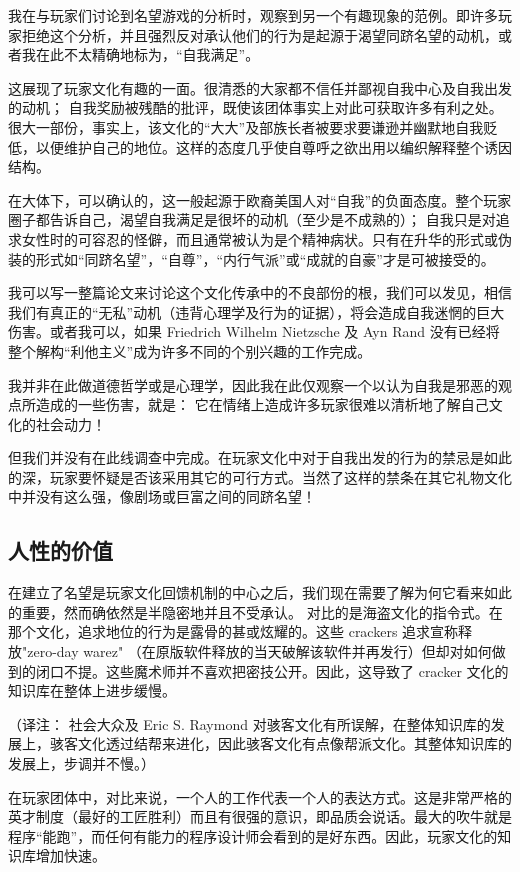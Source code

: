 我在与玩家们讨论到名望游戏的分析时，观察到另一个有趣现象的范例。即许多玩家拒绝这个分析，并且强烈反对承认他们的行为是起源于渴望同跻名望的动机，或者我在此不太精确地标为，“自我满足”。

这展现了玩家文化有趣的一面。很清悉的大家都不信任并鄙视自我中心及自我出发的动机； 自我奖励被残酷的批评，既使该团体事实上对此可获取许多有利之处。很大一部份，事实上，该文化的“大大”及部族长者被要求要谦逊并幽默地自我贬低，以便维护自己的地位。这样的态度几乎使自尊呼之欲出用以编织解释整个诱因结构。

在大体下，可以确认的，这一般起源于欧裔美国人对“自我”的负面态度。整个玩家圈子都告诉自己，渴望自我满足是很坏的动机（至少是不成熟的）； 自我只是对追求女性时的可容忍的怪僻，而且通常被认为是个精神病状。只有在升华的形式或伪装的形式如“同跻名望”，“自尊”，“内行气派”或“成就的自豪”才是可被接受的。

我可以写一整篇论文来讨论这个文化传承中的不良部份的根，我们可以发见，相信我们有真正的“无私”动机（违背心理学及行为的证据），将会造成自我迷惘的巨大伤害。或者我可以，如果 Friedrich Wilhelm Nietzsche 及 Ayn Rand 没有已经将整个解构“利他主义”成为许多不同的个别兴趣的工作完成。

我并非在此做道德哲学或是心理学，因此我在此仅观察一个以认为自我是邪恶的观点所造成的一些伤害，就是： 它在情绪上造成许多玩家很难以清析地了解自己文化的社会动力！

但我们并没有在此线调查中完成。在玩家文化中对于自我出发的行为的禁忌是如此的深，玩家要怀疑是否该采用其它的可行方式。当然了这样的禁条在其它礼物文化中并没有这么强，像剧场或巨富之间的同跻名望！


\subsection{人性的价值}
在建立了名望是玩家文化回馈机制的中心之后，我们现在需要了解为何它看来如此的重要，然而确依然是半隐密地并且不受承认。
对比的是海盗文化的指令式。在那个文化，追求地位的行为是露骨的甚或炫耀的。这些 crackers 追求宣称释放"zero-day warez" （在原版软件释放的当天破解该软件并再发行）但却对如何做到的闭口不提。这些魔术师并不喜欢把密技公开。因此，这导致了 cracker 文化的知识库在整体上进步缓慢。

（译注： 社会大众及 Eric S. Raymond 对骇客文化有所误解，在整体知识库的发展上，骇客文化透过结帮来进化，因此骇客文化有点像帮派文化。其整体知识库的发展上，步调并不慢。）

在玩家团体中，对比来说，一个人的工作代表一个人的表达方式。这是非常严格的英才制度（最好的工匠胜利）而且有很强的意识，即品质会说话。最大的吹牛就是程序“能跑”，而任何有能力的程序设计师会看到的是好东西。因此，玩家文化的知识库增加快速。

